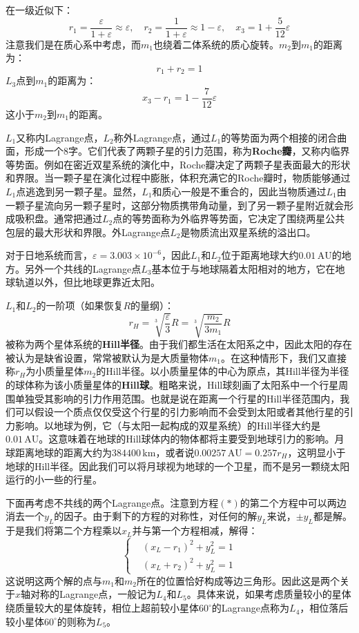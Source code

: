 \documentclass[a4paper,openany]{book}
\begin{document}
在一级近似下：
\[
    r_1 = \frac{\varepsilon}{1+\varepsilon} \approx \varepsilon,\quad r_2 = \frac{1}{1+\varepsilon} \approx 1 - \varepsilon,\quad x_3 = 1 + \frac{5}{12}\varepsilon
\]
注意我们是在质心系中考虑，而$m_1$也绕着二体系统的质心旋转。$m_2$到$m_1$的距离为：
\[
    r_1 + r_2 = 1
\]
$L_3$点到$m_1$的距离为：
\[
    x_3 - r_1 = 1 - \frac{7}{12}\varepsilon
\]
这小于$m_2$到$m_1$的距离。

$L_1$又称内Lagrange点，$L_2$称外Lagrange点，通过$L_1$的等势面为两个相接的闭合曲面，形成一个8字。它们代表了两颗子星的引力范围，称为\textbf{Roche瓣}，又称内临界等势面。例如在密近双星系统的演化中，Roche瓣决定了两颗子星表面最大的形状和界限。当一颗子星在演化过程中膨胀，体积充满它的Roche瓣时，物质能够通过$L_1$点逃逸到另一颗子星。显然，$L_1$和质心一般是不重合的，因此当物质通过$L_1$由一颗子星流向另一颗子星时，这部分物质携带角动量，到了另一颗子星附近就会形成吸积盘。通常把通过$L_2$点的等势面称为外临界等势面，它决定了围绕两星公共包层的最大形状和界限。外Lagrange点$L_2$是物质流出双星系统的溢出口。

对于日地系统而言，$\varepsilon=3.003\times10^{-6}$，因此$L_1$和$L_2$位于距离地球大约$0.01\,\mathrm{AU}$的地方。另外一个共线的Lagrange点$L_3$基本位于与地球隔着太阳相对的地方，它在地球轨道以外，但比地球更靠近太阳。

$L_1$和$L_2$的一阶项（如果恢复$R$的量纲）：
\[
    \boxed{r_H = \sqrt[3]{\frac{\varepsilon}{3}}R = \sqrt[3]{\frac{m_2}{3m_1}}R}
\]
被称为两个星体系统的\textbf{Hill半径}。由于我们都生活在太阳系之中，因此太阳的存在被认为是缺省设置，常常被默认为是大质量物体$m_1$。在这种情形下，我们又直接称$r_H$为小质量星体$m_2$的Hill半径。以小质量星体的中心为原点，其Hill半径为半径的球体称为该小质量星体的\textbf{Hill球}。粗略来说，Hill球刻画了太阳系中一个行星周围单独受其影响的引力作用范围。也就是说在距离一个行星的Hill半径范围内，我们可以假设一个质点仅仅受这个行星的引力影响而不会受到太阳或者其他行星的引力影响。以地球为例，它（与太阳一起构成的双星系统）的Hill半径大约是$0.01\,\mathrm{AU}$。这意味着在地球的Hill球体内的物体都将主要受到地球引力的影响。月球距离地球的距离大约为$384400\,\mathrm{km}$，或者说$0.00257\,\mathrm{AU}=0.257r_H$，这明显小于地球的Hill半径。因此我们可以将月球视为地球的一个卫星，而不是另一颗绕太阳运行的小一些的行星。

下面再考虑不共线的两个Lagrange点。注意到方程$(\ast)$的第二个方程中可以两边消去一个$y_L$的因子。由于剩下的方程的对称性，对任何的解$y_L$来说，$\pm y_L$都是解。于是我们将第二个方程乘以$x_L$并与第一个方程相减，解得：
\[
    \left\{
\begin{aligned}
    &(x_L-r_1)^2 + y_L^2 = 1 \\
    &(x_L+r_2)^2 + y_L^2 = 1
\end{aligned}
\right.
\]
这说明这两个解的点与$m_1$和$m_2$所在的位置恰好构成等边三角形。因此这是两个关于$x$轴对称的Lagrange点，一般记为$L_4$和$L_5$。具体来说，如果考虑质量较小的星体绕质量较大的星体旋转，相位上超前较小星体$60^\circ$的Lagrange点称为$L_4$，相位落后较小星体$60^\circ$的则称为$L_5$。
\end{document}

